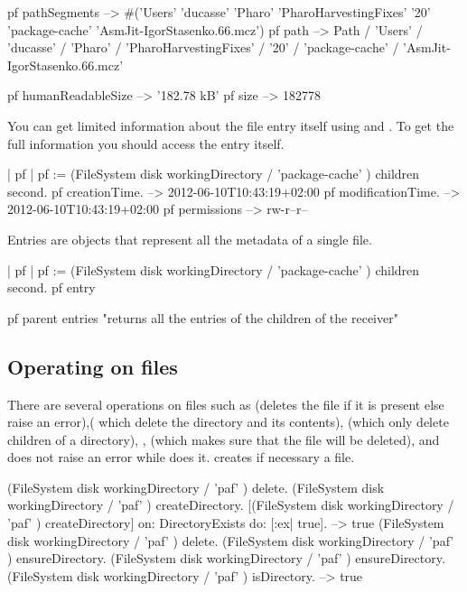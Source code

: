 \documentclass[a4paper,10pt,twoside]{book}
\begin{document}
\begin{code}{}
pf pathSegments  
	-->  #('Users' 'ducasse' 'Pharo' 'PharoHarvestingFixes' '20' 'package-cache' 'AsmJit-IgorStasenko.66.mcz')
pf path
    -->  Path / 'Users' / 'ducasse' / 'Pharo' / 'PharoHarvestingFixes' / '20' / 'package-cache' / 'AsmJit-IgorStasenko.66.mcz'
\end{code}



\begin{code}{}
pf humanReadableSize 
	--> '182.78 kB'
pf size 
	--> 182778
\end{code}  


You can get limited information about the file entry itself using  and . 
To get the full information you should access the entry itself.

\begin{code}{}
| pf |
pf := (FileSystem disk workingDirectory / 'package-cache' ) children second.
pf creationTime.
	--> 2012-06-10T10:43:19+02:00
pf modificationTime.
	--> 2012-06-10T10:43:19+02:00
pf permissions
	--> rw-r--r--
\end{code}

Entries are objects that represent all the metadata of a single file. 
\begin{code}{}
| pf |
pf := (FileSystem disk workingDirectory / 'package-cache' ) children second.
pf entry

pf parent entries
	"returns all the entries of the children of the receiver"
\end{code}


\subsection{Operating on files}
There are several operations on files such as  (deletes the file if it is present else raise an error),( which delete the directory and its contents),  (which only delete children of a directory), ,  (which makes sure that the file will be deleted), and  does not raise an error while  does it.  creates if necessary a file.


\begin{code}{}
(FileSystem disk workingDirectory / 'paf' ) delete.
(FileSystem disk workingDirectory / 'paf' ) createDirectory.
[(FileSystem disk workingDirectory / 'paf' ) createDirectory] on: DirectoryExists do: [:ex| true].
	--> true
(FileSystem disk workingDirectory / 'paf' ) delete.
(FileSystem disk workingDirectory / 'paf' ) ensureDirectory.
(FileSystem disk workingDirectory / 'paf' ) ensureDirectory.
(FileSystem disk workingDirectory / 'paf' ) isDirectory.
  --> true
\end{code}
\end{document}
